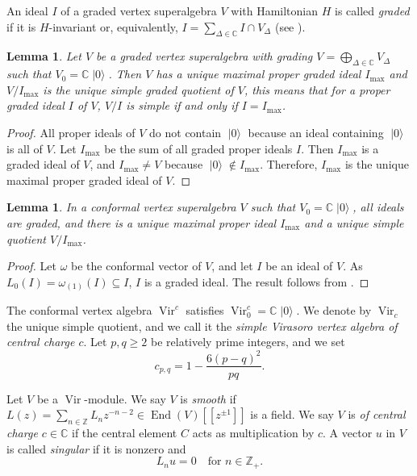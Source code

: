 \documentclass[a4paper, 12pt, reqno]{amsart}
\newtheorem{lemma}[theorem]{Lemma}
\theoremstyle{remark}
\DeclareMathOperator{\Vir}{Vir}
\DeclareMathOperator{\End}{End}
\DeclareMathOperator{\vac}{|0\rangle}
\begin{document}
An ideal $I$ of a graded vertex superalgebra $V$ with Hamiltonian $H$ is called \emph{graded} if it is $H$-invariant or, equivalently, $I = \sum_{\Delta \in \mathbb{C}}I \cap V_{\Delta}$ (see ).

\begin{lemma}
  \label{lmm:11}
  Let $V$ be a graded vertex superalgebra with grading $V = \bigoplus_{\Delta \in \mathbb{C}}V_{\Delta}$ such that $V_0 = \mathbb{C}\vac$.
  Then $V$ has a unique maximal proper graded ideal $I_{\max}$ and $V/I_{\max}$ is the unique simple graded quotient of $V$, this means that for a proper graded ideal $I$ of $V$, $V/I$ is simple if and only if $I = I_{\max}$.
\end{lemma}

\begin{proof}
  All proper ideals of $V$ do not contain $\vac$ because an ideal containing $\vac$ is all of $V$.
  Let $I_{\max}$ be the sum of all graded proper ideals $I$.
  Then $I_{\max}$ is a graded ideal of $V$, and $I_{\max} \neq V$ because $\vac \notin I_{\max}$.
  Therefore, $I_{\max}$ is the unique maximal proper graded ideal of $V$.
\end{proof}

\begin{lemma}
  \label{lmm:12}
  In a conformal vertex superalgebra $V$ such that $V_0 = \mathbb{C}\vac$, all ideals are graded, and there is a unique maximal proper ideal $I_{\max}$ and a unique simple quotient $V/I_{\max}$.
\end{lemma}

\begin{proof}
  Let $\omega$ be the conformal vector of $V$, and let $I$ be an ideal of $V$.
  As $L_0(I) = \omega_{(1)}(I) \subseteq I$, $I$ is a graded ideal.
  The result follows from .
\end{proof}

The conformal vertex algebra $\Vir^c$ satisfies $\Vir^c_0 = \mathbb{C}\vac$.
We denote by $\Vir_c$ the unique simple quotient, and we call it the \emph{simple Virasoro vertex algebra of central charge $c$}.
Let $p, q \ge 2$ be relatively prime integers, and we set
\begin{equation*}
  c_{p, q} = 1 - \frac{6(p - q)^2}{pq}.
\end{equation*}

Let $V$ be a $\Vir$-module.
We say $V$ is \emph{smooth} if $L(z) = \sum_{n \in \mathbb{Z}}L_{n}z^{-n - 2} \in \End(V)[[z^{\pm 1}]]$ is a field.
We say $V$ is \emph{of central charge $c \in \mathbb{C}$} if the central element $C$ acts as multiplication by $c$.
A vector $u$ in $V$ is called \emph{singular} if it is nonzero and
\begin{equation*}
  L_nu = 0 \quad \text{for $n \in \mathbb{Z}_+$}.
\end{equation*}
\end{document}

